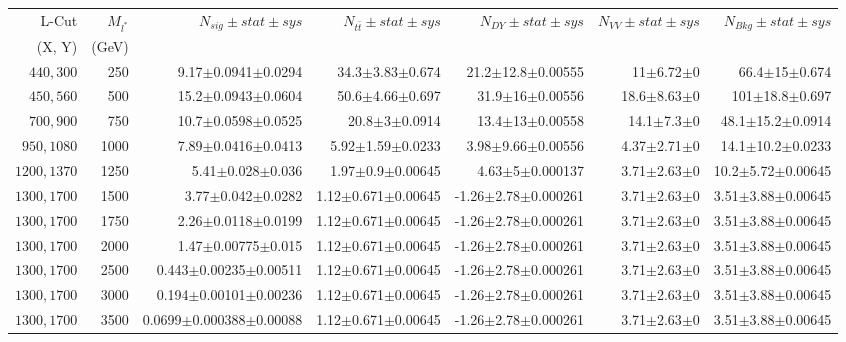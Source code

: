 \documentclass[]{article}
\begin{document}
\begin{table}
\begin{center}
\scriptsize{
\begin{tabular}{ |r|r|r|r|r|r|r|}
\hline 
L-Cut & $M_{l^*}$ & $N_{sig}\pm stat \pm sys $ &$N_{t\bar{t}}\pm stat \pm sys $ & $N_{DY}\pm stat \pm sys $ & $N_{VV}\pm stat \pm sys $ &$N_{Bkg}\pm stat \pm sys$\\
(X, Y) & (GeV) & && &&\\
\hline 
$440, 300$ & 250 & 9.17$\pm$0.0941$\pm$0.0294 & 34.3$\pm$3.83$\pm$0.674 & 21.2$\pm$12.8$\pm$0.00555 & 11$\pm$6.72$\pm$0 & 66.4$\pm$15$\pm$0.674 \\
$450, 560$ & 500 & 15.2$\pm$0.0943$\pm$0.0604 & 50.6$\pm$4.66$\pm$0.697 & 31.9$\pm$16$\pm$0.00556 & 18.6$\pm$8.63$\pm$0 & 101$\pm$18.8$\pm$0.697 \\
$700, 900$ & 750 & 10.7$\pm$0.0598$\pm$0.0525 & 20.8$\pm$3$\pm$0.0914 & 13.4$\pm$13$\pm$0.00558 & 14.1$\pm$7.3$\pm$0 & 48.1$\pm$15.2$\pm$0.0914 \\
$950, 1080$ & 1000 & 7.89$\pm$0.0416$\pm$0.0413 & 5.92$\pm$1.59$\pm$0.0233 & 3.98$\pm$9.66$\pm$0.00556 & 4.37$\pm$2.71$\pm$0 & 14.1$\pm$10.2$\pm$0.0233 \\
$1200, 1370$ & 1250 & 5.41$\pm$0.028$\pm$0.036 & 1.97$\pm$0.9$\pm$0.00645 & 4.63$\pm$5$\pm$0.000137 & 3.71$\pm$2.63$\pm$0 & 10.2$\pm$5.72$\pm$0.00645 \\
$1300, 1700$ & 1500 & 3.77$\pm$0.042$\pm$0.0282 & 1.12$\pm$0.671$\pm$0.00645 & -1.26$\pm$2.78$\pm$0.000261 & 3.71$\pm$2.63$\pm$0 & 3.51$\pm$3.88$\pm$0.00645 \\
$1300, 1700$ & 1750 & 2.26$\pm$0.0118$\pm$0.0199 & 1.12$\pm$0.671$\pm$0.00645 & -1.26$\pm$2.78$\pm$0.000261 & 3.71$\pm$2.63$\pm$0 & 3.51$\pm$3.88$\pm$0.00645 \\
$1300, 1700$ & 2000 & 1.47$\pm$0.00775$\pm$0.015 & 1.12$\pm$0.671$\pm$0.00645 & -1.26$\pm$2.78$\pm$0.000261 & 3.71$\pm$2.63$\pm$0 & 3.51$\pm$3.88$\pm$0.00645 \\
$1300, 1700$ & 2500 & 0.443$\pm$0.00235$\pm$0.00511 & 1.12$\pm$0.671$\pm$0.00645 & -1.26$\pm$2.78$\pm$0.000261 & 3.71$\pm$2.63$\pm$0 & 3.51$\pm$3.88$\pm$0.00645 \\
$1300, 1700$ & 3000 & 0.194$\pm$0.00101$\pm$0.00236 & 1.12$\pm$0.671$\pm$0.00645 & -1.26$\pm$2.78$\pm$0.000261 & 3.71$\pm$2.63$\pm$0 & 3.51$\pm$3.88$\pm$0.00645 \\
$1300, 1700$ & 3500 & 0.0699$\pm$0.000388$\pm$0.00088 & 1.12$\pm$0.671$\pm$0.00645 & -1.26$\pm$2.78$\pm$0.000261 & 3.71$\pm$2.63$\pm$0 & 3.51$\pm$3.88$\pm$0.00645 \\

\end{tabular}}
\end{center}
\end{table}
\end{document}
